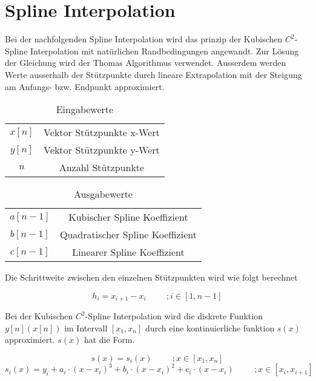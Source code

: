 \documentclass[12pt,titlepage]{article}
\begin{document}
\section{Spline Interpolation}

Bei der nachfolgenden Spline Interpolation wird das prinzip der Kubischen $C^2$-Spline Interpolation mit natürlichen Randbedingungen angewandt. Zur Lösung der Gleichung wird der Thomas Algorithmus verwendet. Ausserdem werden Werte ausserhalb der Stützpunkte durch lineare Extrapolation mit der Steigung am Anfangs- bzw. Endpunkt approximiert.
\newline

\begin{table}[h]
    \centering
    \begin{tabular}{c|c}
        $x[n]$ & Vektor Stützpunkte x-Wert\\
        $y[n]$ & Vektor Stützpunkte y-Wert\\
        $n$ & Anzahl Stützpunkte\\
    \end{tabular}
    \caption{Eingabewerte}
\end{table}

\begin{table}[h]
    \centering
    \begin{tabular}{c|c}
        $a[n-1]$ & Kubischer Spline Koeffizient\\
        $b[n-1]$ & Quadratischer Spline Koeffizient\\
        $c[n-1]$ & Linearer Spline Koeffizient
    \end{tabular}
    \caption{Ausgabewerte}
\end{table}

Die Schrittweite zwischen den einzelnen Stützpunkten wird wie folgt berechnet
\newline

\begin{equation}
    h_i = x_{i+1}-x_i \hspace{1cm} ;i\in [1,n-1]
\end{equation}
\newline

Bei der Kubischen  $C^2$-Spline Interpolation wird die diskrete Funktion $y[n](x[n])$ im Intervall $[x_1,x_n]$ durch eine kontinuierliche funktion $s(x)$ approximiert. $s(x)$ hat die Form.
\newline


\begin{equation*}
    s(x) = s_i(x) \hspace{1cm} ;x\in [x_1,x_n]
\end{equation*}
\newline
\begin{equation}
    s_i(x) = y_i+a_i\cdot (x-x_i)^3+b_i\cdot  (x-x_i)^2+c_i\cdot  (x-x_i) \hspace{1cm} ;x\in [x_i,x_{i+1}]
\end{equation}
\newline
\end{document}
